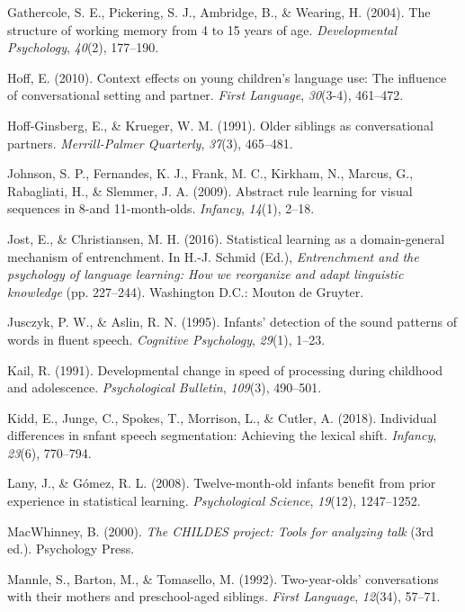 \documentclass[man,mask,floatsintext]{apa6}
\theoremstyle{definition}
\theoremstyle{definition}
\theoremstyle{definition}
\theoremstyle{remark}
\begin{document}
\hypertarget{ref-gathercole2004structure}{}
Gathercole, S. E., Pickering, S. J., Ambridge, B., \& Wearing, H.
(2004). The structure of working memory from 4 to 15 years of age.
\emph{Developmental Psychology}, \emph{40}(2), 177--190.

\hypertarget{ref-hoff2010context}{}
Hoff, E. (2010). Context effects on young children's language use: The
influence of conversational setting and partner. \emph{First Language},
\emph{30}(3-4), 461--472.

\hypertarget{ref-hoff1991older}{}
Hoff-Ginsberg, E., \& Krueger, W. M. (1991). Older siblings as
conversational partners. \emph{Merrill-Palmer Quarterly}, \emph{37}(3),
465--481.

\hypertarget{ref-johnson2009abstract}{}
Johnson, S. P., Fernandes, K. J., Frank, M. C., Kirkham, N., Marcus, G.,
Rabagliati, H., \& Slemmer, J. A. (2009). Abstract rule learning for
visual sequences in 8-and 11-month-olds. \emph{Infancy}, \emph{14}(1),
2--18.

\hypertarget{ref-jost201610}{}
Jost, E., \& Christiansen, M. H. (2016). Statistical learning as a
domain-general mechanism of entrenchment. In H.-J. Schmid (Ed.),
\emph{Entrenchment and the psychology of language learning: How we
reorganize and adapt linguistic knowledge} (pp. 227--244). Washington
D.C.: Mouton de Gruyter.

\hypertarget{ref-jusczyk1995infants}{}
Jusczyk, P. W., \& Aslin, R. N. (1995). Infants' detection of the sound
patterns of words in fluent speech. \emph{Cognitive Psychology},
\emph{29}(1), 1--23.

\hypertarget{ref-kail1991developmental}{}
Kail, R. (1991). Developmental change in speed of processing during
childhood and adolescence. \emph{Psychological Bulletin}, \emph{109}(3),
490--501.

\hypertarget{ref-kidd2018individual}{}
Kidd, E., Junge, C., Spokes, T., Morrison, L., \& Cutler, A. (2018).
Individual differences in snfant speech segmentation: Achieving the
lexical shift. \emph{Infancy}, \emph{23}(6), 770--794.

\hypertarget{ref-lany2008twelve}{}
Lany, J., \& Gómez, R. L. (2008). Twelve-month-old infants benefit from
prior experience in statistical learning. \emph{Psychological Science},
\emph{19}(12), 1247--1252.

\hypertarget{ref-childes}{}
MacWhinney, B. (2000). \emph{The CHILDES project: Tools for analyzing
talk} (3rd ed.). Psychology Press.

\hypertarget{ref-mannle1992twoyearolds}{}
Mannle, S., Barton, M., \& Tomasello, M. (1992). Two-year-olds'
conversations with their mothers and preschool-aged siblings.
\emph{First Language}, \emph{12}(34), 57--71.
\end{document}
